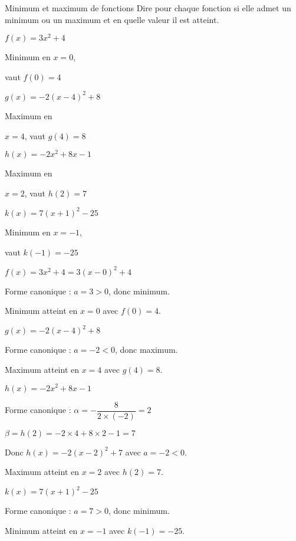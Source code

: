 \begin{EXO}{Minimum et maximum de fonctions}{}
 Dire pour chaque fonction si elle admet un minimum ou un maximum et en quelle valeur il est atteint.

\begin{tcbenumerate}[4]
\tcbitem $f(x) = 3x^2+4$

\begin{crep}
Minimum en $x=0$,

vaut $f(0)=4$
\end{crep}

\tcbitem $g(x)= -2(x-4)^2+8$

\begin{crep}
Maximum en 

$x=4$, vaut $g(4)=8$
\end{crep}

\tcbitem $h(x)= -2x^2+8x-1$

\begin{crep}
Maximum en 

$x=2$, vaut $h(2)=7$
\end{crep}

\tcbitem $k(x)= 7(x+1)^2-25$

\begin{crep}
Minimum en $x=-1$, 

vaut $k(-1)=-25$
\end{crep}
\end{tcbenumerate}

\exocorrection

\begin{tcbenumerate}[2]
\tcbitem $f(x) = 3x^2+4 = 3(x-0)^2+4$

Forme canonique : $a=3>0$, donc minimum.

Minimum atteint en $x=0$ avec $f(0)=4$.

\tcbitem $g(x)= -2(x-4)^2+8$

Forme canonique : $a=-2<0$, donc maximum.

Maximum atteint en $x=4$ avec $g(4)=8$.

\tcbitem $h(x)= -2x^2+8x-1$

Forme canonique : $\alpha = -\dfrac{8}{2 \times (-2)} = 2$

$\beta = h(2) = -2 \times 4 + 8 \times 2 - 1 = 7$

Donc $h(x) = -2(x-2)^2+7$ avec $a=-2<0$.

Maximum atteint en $x=2$ avec $h(2)=7$.

\tcbitem $k(x)= 7(x+1)^2-25$

Forme canonique : $a=7>0$, donc minimum.

Minimum atteint en $x=-1$ avec $k(-1)=-25$.
\end{tcbenumerate}
\end{EXO}